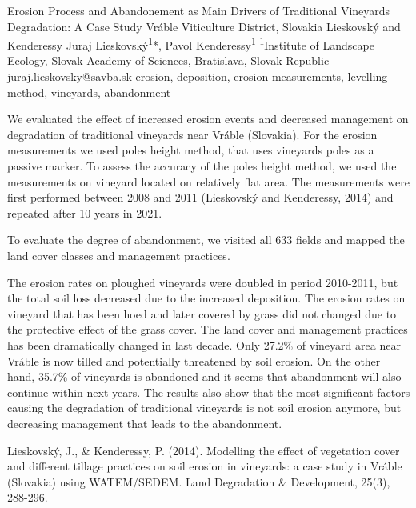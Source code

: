 
\abstract
{Erosion Process and Abandonement as Main Drivers of Traditional Vineyards Degradation: A Case Study Vráble Viticulture District, Slovakia} 
{Lieskovský and Kenderessy} 
{Juraj Lieskovský\textsuperscript{1}*, Pavol Kenderessy\textsuperscript{1}} 
{\KLtag} 
{
\textsuperscript{1}Institute of Landscape Ecology, Slovak Academy of Sciences, Bratislava, Slovak Republic
}
{juraj.lieskovsky@savba.sk}  %
{erosion, deposition, erosion measurements, levelling method, vineyards, abandonment}
{We evaluated the effect of increased erosion events and decreased management on degradation of traditional vineyards near Vráble (Slovakia). For the erosion measurements we used poles height method, that uses vineyards poles as a passive marker. To assess the accuracy of the poles height method, we used the measurements on vineyard located on relatively flat area. The measurements were first performed between 2008 and 2011 (Lieskovský and Kenderessy, 2014) and repeated after 10 years in 2021.

To evaluate the degree of abandonment, we visited all 633 fields and mapped the land cover classes and management practices. 

The erosion rates on ploughed vineyards were doubled in period 2010-2011, but the total soil loss decreased due to the increased deposition. The erosion rates on vineyard that has been hoed and later covered by grass did not changed due to the protective effect of the grass cover. The land cover and management practices has been dramatically changed in last decade. Only 27.2\% of vineyard area near Vráble is now tilled and potentially threatened by soil erosion. On the other hand, 35.7\% of vineyards is abandoned and it seems that abandonment will also continue within next years. The results also show that the most significant factors causing the degradation of traditional vineyards is not soil erosion anymore, but decreasing management that leads to the abandonment.
}
{Lieskovský, J., \& Kenderessy, P. (2014). Modelling the effect of vegetation cover and different tillage practices on soil erosion in vineyards: a case study in Vráble (Slovakia) using WATEM/SEDEM. Land Degradation \& Development, 25(3), 288-296.
}

